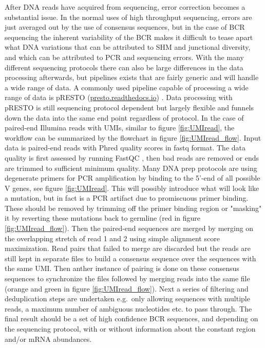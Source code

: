 After DNA reads have acquired from sequencing, error correction becomes a substantial issue.
In the normal uses of high throughput sequencing, errors are just averaged out by the use of consensus sequences, but in the case of BCR sequencing the inherent variability of the BCR makes it difficult to tease apart what DNA variations that can be attributed to SHM and junctional diversity, and which can be attributed to PCR and sequencing errors.
With the many different sequencing protocols there can also be large differences in the data processing afterwards, but pipelines exists that are fairly generic and will handle a wide range of data.
A commonly used pipeline capable of processing a wide range of data is pRESTO (\url{presto.readthedocs.io}) \cite{vander2014presto}.
Data processing with pRESTO is still sequencing protocol dependent but largely flexible and funnels down the data into the same end point regardless of protocol.
In the case of paired-end Illumina reads with UMIs, similar to figure \ref{fig:UMIread}, the workflow can be summarized by the flowchart in figure \ref{fig:UMIread_flow}.
Input data is paired-end reads with Phred quality scores in fastq format.
The data quality is first assessed by running FastQC \cite{andrews2010fastqc}, then bad reads are removed or ends are trimmed to sufficient minimum quality.
Many DNA prep protocols are using degenerate primers for PCR amplification by binding to the 5'-end of all possible V genes, see figure \ref{fig:UMIread}.
This will possibly introduce what will look like a mutation, but in fact is a PCR artifact due to promiscuous primer binding.
These should be removed by trimming off the primer binding region or "masking" it by reverting these mutations back to germline (red in figure \ref{fig:UMIread_flow}).
Then the paired-end sequences are merged by merging on the overlapping stretch of read 1 and 2 using simple alignment score maximization.
Read pairs that failed to merge are discarded but the reads are still kept in separate files to build a consensus sequence over the sequences with the same UMI.
Then anther instance of pairing is done on these consensus sequences to synchronize the files followed by merging reads into the same file (orange and green in figure \ref{fig:UMIread_flow}).
Next a series of filtering and deduplication steps are undertaken e.g.\ only allowing sequences with multiple reads, a maximum number of ambiguous nucleotides etc. to pass through.
The final result should be a set of high confidence BCR sequences, and depending on the sequencing protocol, with or without information about the constant region and/or mRNA abundances.

